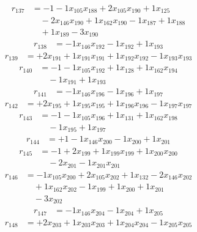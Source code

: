 \[\begin{aligned}
r_{137} &= - 1 - 1 x_{105} x_{188} + 2 x_{105} x_{190} + 1 x_{125} \\
 &\quad - 2 x_{146} x_{190} + 1 x_{162} x_{190} - 1 x_{187} + 1 x_{188} \\
 &\quad + 1 x_{189} - 3 x_{190}
\end{aligned}\]
\[\begin{aligned}
r_{138} &= - 1 x_{146} x_{192} - 1 x_{192} + 1 x_{193}
\end{aligned}\]
\[\begin{aligned}
r_{139} &= + 2 x_{191} + 1 x_{191} x_{191} + 1 x_{192} x_{192} - 1 x_{193} x_{193}
\end{aligned}\]
\[\begin{aligned}
r_{140} &= - 1 - 1 x_{105} x_{192} + 1 x_{128} + 1 x_{162} x_{194} \\
 &\quad - 1 x_{191} + 1 x_{193}
\end{aligned}\]
\[\begin{aligned}
r_{141} &= - 1 x_{146} x_{196} - 1 x_{196} + 1 x_{197}
\end{aligned}\]
\[\begin{aligned}
r_{142} &= + 2 x_{195} + 1 x_{195} x_{195} + 1 x_{196} x_{196} - 1 x_{197} x_{197}
\end{aligned}\]
\[\begin{aligned}
r_{143} &= - 1 - 1 x_{105} x_{196} + 1 x_{131} + 1 x_{162} x_{198} \\
 &\quad - 1 x_{195} + 1 x_{197}
\end{aligned}\]
\[\begin{aligned}
r_{144} &= + 1 - 1 x_{146} x_{200} - 1 x_{200} + 1 x_{201}
\end{aligned}\]
\[\begin{aligned}
r_{145} &= - 1 + 2 x_{199} + 1 x_{199} x_{199} + 1 x_{200} x_{200} \\
 &\quad - 2 x_{201} - 1 x_{201} x_{201}
\end{aligned}\]
\[\begin{aligned}
r_{146} &= - 1 x_{105} x_{200} + 2 x_{105} x_{202} + 1 x_{132} - 2 x_{146} x_{202} \\
 &\quad + 1 x_{162} x_{202} - 1 x_{199} + 1 x_{200} + 1 x_{201} \\
 &\quad - 3 x_{202}
\end{aligned}\]
\[\begin{aligned}
r_{147} &= - 1 x_{146} x_{204} - 1 x_{204} + 1 x_{205}
\end{aligned}\]
\[\begin{aligned}
r_{148} &= + 2 x_{203} + 1 x_{203} x_{203} + 1 x_{204} x_{204} - 1 x_{205} x_{205}
\end{aligned}\]
